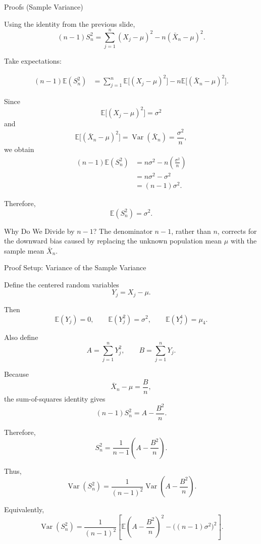\begin{frame}{Proofs (Sample Variance)}

\small

Using the identity from the previous slide,
\[
(n-1)S_n^2
=
\sum_{j=1}^n(X_j-\mu)^2
-
n(\bar X_n-\mu)^2.
\]

Take expectations:

\[
\begin{aligned}
(n-1)\mathbb{E}(S_n^2)
&=
\sum_{j=1}^n
\mathbb{E}\bigl[(X_j-\mu)^2\bigr]
-
n\mathbb{E}\bigl[(\bar X_n-\mu)^2\bigr].
\end{aligned}
\]

Since
\[
\mathbb{E}\bigl[(X_j-\mu)^2\bigr]=\sigma^2
\]
and
\[
\mathbb{E}\bigl[(\bar X_n-\mu)^2\bigr]
=
\operatorname{Var}(\bar X_n)
=
\frac{\sigma^2}{n},
\]
we obtain
\[
\begin{aligned}
(n-1)\mathbb{E}(S_n^2)
&=
n\sigma^2
-
n\left(\frac{\sigma^2}{n}\right)\\
&=
n\sigma^2-\sigma^2\\
&=
(n-1)\sigma^2.
\end{aligned}
\]

Therefore,
\[
\boxed{\mathbb{E}(S_n^2)=\sigma^2.}
\]

\begin{keybox}{Why Do We Divide by \(n-1\)?}
The denominator \(n-1\), rather than \(n\), corrects for the downward bias caused
by replacing the unknown population mean \(\mu\) with the sample mean \(\bar X_n\).
\end{keybox}

\end{frame}




\begin{frame}{Proof Setup: Variance of the Sample Variance}

\small

Define the centered random variables
\[
Y_j=X_j-\mu.
\]

Then
\[
\mathbb{E}(Y_j)=0,
\qquad
\mathbb{E}(Y_j^2)=\sigma^2,
\qquad
\mathbb{E}(Y_j^4)=\mu_4.
\]

Also define
\[
A=\sum_{j=1}^n Y_j^2,
\qquad
B=\sum_{j=1}^n Y_j.
\]

Because
\[
\bar X_n-\mu=\frac{B}{n},
\]
the sum-of-squares identity gives
\[
(n-1)S_n^2
=
A-\frac{B^2}{n}.
\]

Therefore,
\[
S_n^2
=
\frac{1}{n-1}
\left(
A-\frac{B^2}{n}
\right).
\]

Thus,
\[
\operatorname{Var}(S_n^2)
=
\frac{1}{(n-1)^2}
\operatorname{Var}\left(A-\frac{B^2}{n}\right).
\]

Equivalently,
\[
\operatorname{Var}(S_n^2)
=
\frac{1}{(n-1)^2}
\left[
\mathbb{E}\left(A-\frac{B^2}{n}\right)^2
-
\bigl((n-1)\sigma^2\bigr)^2
\right].
\]

\end{frame}


